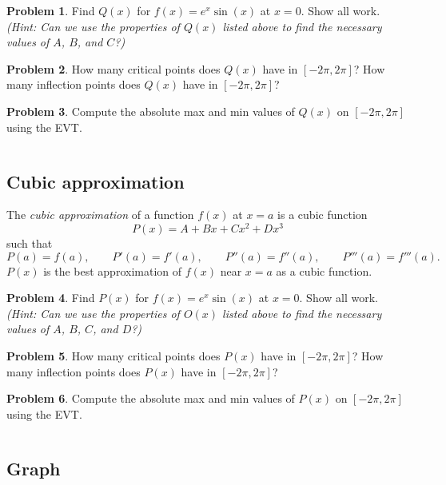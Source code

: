 \documentclass[11pt,reqno,final]{amsart}
\numberwithin{equation}{section}
\numberwithin{figure}{section}
\theoremstyle{definition} %
\newtheorem{problem}{Problem}
\begin{document}
\begin{problem}
        Find $Q(x)$ for $f(x) = e^x \sin(x)$ at $x = 0$. Show all work. \\
        \textit{(Hint: Can we use the properties of $Q(x)$ listed above to find the necessary values of $A$, $B$, and $C$?)}
\end{problem}

\begin{problem}
        How many critical points does $Q(x)$ have in $[-2\pi, 2\pi]$?
        How many inflection points does $Q(x)$ have in $[-2\pi, 2\pi]$?        
\end{problem}

\begin{problem}
         Compute the absolute max and min values of $Q(x)$ on $[-2\pi, 2\pi]$ using the EVT.
\end{problem}

$ $ 

\subsection{Cubic approximation}
The \textit{cubic approximation} of a function $f(x)$ at $x = a$ is a cubic function
\[
        P(x) = A + Bx + Cx^2 + Dx^3
\]
such that
\[
        P(a) = f(a), \qquad
        P'(a) = f'(a), \qquad
        P''(a) = f''(a), \qquad
        P'''(a) = f'''(a).
\]
$P(x)$ is the best approximation of $f(x)$ near $x = a$ as a cubic function.

\begin{problem}
        Find $P(x)$ for $f(x) = e^x \sin(x)$ at $x = 0$. Show all work.\\
        \textit{(Hint: Can we use the properties of $O(x)$ listed above to find the necessary values of $A$, $B$, $C$, and $D$?)}
\end{problem}

\begin{problem}
        How many critical points does $P(x)$ have in $[-2\pi, 2\pi]$?
        How many inflection points does $P(x)$ have in $[-2\pi, 2\pi]$?        
\end{problem}

\begin{problem}
         Compute the absolute max and min values of $P(x)$ on $[-2\pi, 2\pi]$ using the EVT.
\end{problem}

$ $

\subsection{Graph}
\end{document}

